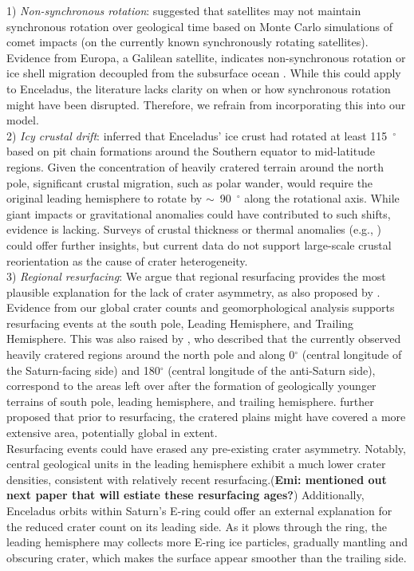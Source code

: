 \documentclass[preprint,12pt,3p,times,authoryear]{elsarticle}
\begin{document}
{1) \textit{Non-synchronous rotation}: \citet{Zahnle2001} suggested that satellites may not maintain synchronous rotation over geological time based on Monte Carlo simulations of comet impacts (on the currently known synchronously rotating satellites). Evidence from Europa, a Galilean satellite, indicates non-synchronous rotation or ice shell migration decoupled from the subsurface ocean \citep{Kattenhorn2009,Collins2009}. While this could apply to Enceladus, the literature lacks clarity on when or how synchronous rotation might have been disrupted. Therefore, we refrain from incorporating this into our model.\\

2) \textit{Icy crustal drift}: \citet{Martin2014} inferred that Enceladus' ice crust had rotated at least 115~$^\circ$ based on pit chain formations around the Southern equator to mid-latitude regions. Given the concentration of heavily cratered terrain around the north pole, significant crustal migration, such as polar wander, would require the original leading hemisphere to rotate by $\sim$~90~$^\circ$ along the rotational axis. While giant impacts or gravitational anomalies could have contributed to such shifts, evidence is lacking. Surveys of crustal thickness or thermal anomalies (e.g., \citealt{Schenk2024}) could offer further insights, but current data do not support large-scale crustal reorientation as the cause of crater heterogeneity.\\

3) \textit{Regional resurfacing}: We argue that regional resurfacing provides the most plausible explanation for the lack of crater asymmetry, as also proposed by \citet{Zahnle2001}.
Evidence from our global crater counts and geomorphological analysis supports resurfacing events at the south pole, Leading Hemisphere, and Trailing Hemisphere. This was also raised by \citet{Patterson2018}, who described that the currently observed heavily cratered regions around the north pole and along 0$^\circ$ (central longitude of the Saturn-facing side) and 180$^\circ$ (central longitude of the anti-Saturn side), correspond to the areas left over after the formation of geologically younger terrains of south pole, leading hemisphere, and trailing hemisphere. \citet{Patterson2018} further proposed that prior to resurfacing, the cratered plains might have covered a more extensive area, potentially global in extent.\\

Resurfacing events could have erased any pre-existing crater asymmetry. Notably, central geological units in the leading hemisphere exhibit a much lower crater densities, consistent with relatively recent resurfacing.(\textbf{Emi: mentioned out next paper that will estiate these resurfacing ages?}) 
Additionally, Enceladus orbits within Saturn's E-ring could offer an external explanation for the reduced crater count on its leading side. As it plows through the ring, the leading hemisphere may collects more E-ring ice particles, gradually mantling and obscuring crater, which makes the surface appear smoother than the trailing side.\\

}
\end{document}

